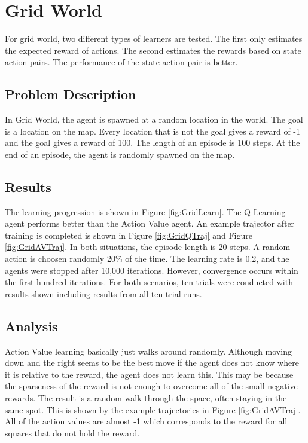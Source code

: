 
\section{Grid World}
For grid world, two different types of learners are tested.  The first only estimates the expected reward of actions.  The second estimates the rewards based on state action pairs.  The performance of the state action pair is better.

\subsection{Problem Description}
In Grid World, the agent is spawned at a random location in the world.  The goal is a location on the map.  Every location that is not the goal gives a reward of -1 and the goal gives a reward of 100.  The length of an episode is 100 steps.  At the end of an episode, the agent is randomly spawned on the map.

\subsection{Results}
The learning progression is shown in Figure \ref{fig:GridLearn}.  The Q-Learning agent performs better than the Action Value agent.  An example trajector after training is completed is shown in Figure \ref{fig:GridQTraj} and Figure \ref{fig:GridAVTraj}.  In both situations, the episode length is 20 steps.  A random action is choosen randomly 20\% of the time.  The learning rate is 0.2, and the agents were stopped after 10,000 iterations.  However, convergence occurs within the first hundred iterations.  For both scenarios, ten trials were conducted with results shown including results from all ten trial runs.

\subsection{Analysis}
Action Value learning basically just walks around randomly.  Although moving down and the right seems to be the best move if the agent does not know where it is relative to the reward, the agent does not learn this.  This may be because the sparseness of the reward is not enough to overcome all of the small negative rewards.  The result is a random walk through the space, often staying in the same spot.  This is shown by the example trajectories in Figure \ref{fig:GridAVTraj}.  All of the action values are almost -1 which corresponds to the reward for all squares that do not hold the reward.  

